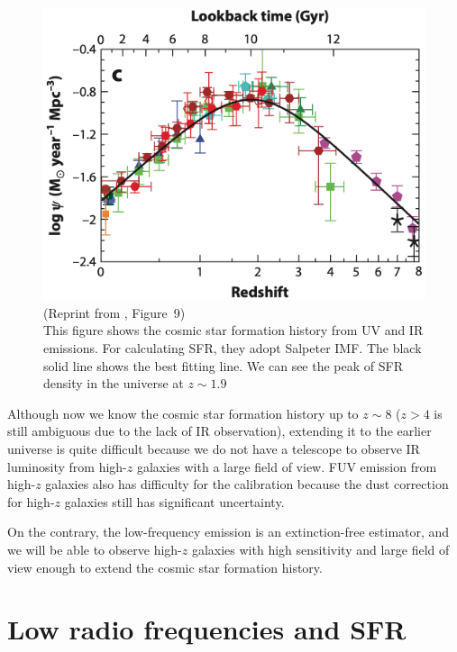 \begin{figure}[htbp]
	\centering
	\includegraphics[width=.7\linewidth]{Chapter_1/Figures/Madau2014_Figure9.png}
    \caption[Reprint from \citet{Madau2014} (Figure~9)]{\label{fig:Madau2014_figure9}
        (Reprint from \citet{Madau2014}, Figure~9)\\
        This figure shows the cosmic star formation history from UV and IR emissions.
        For calculating SFR, they adopt Salpeter IMF\@.
        The black solid line shows the best fitting line.
        We can see the peak of SFR density in the universe at $z\sim1.9$
    }
\end{figure}

Although now we know the cosmic star formation history up to $z\sim8$ ($z > 4$ is still ambiguous due to the lack of IR observation), extending it to the earlier universe is quite difficult because we do not have a telescope to observe IR luminosity from high-$z$ galaxies with a large field of view.
FUV emission from high-$z$ galaxies also has difficulty for the calibration because the dust correction for high-$z$ galaxies still has significant uncertainty.

On the contrary, the low-frequency emission is an extinction-free estimator, and we will be able to observe high-$z$ galaxies with high sensitivity and large field of view enough to extend the cosmic star formation history.





\section{Low radio frequencies and SFR}\label{sec:lowradiofrequenciesandsfr}

